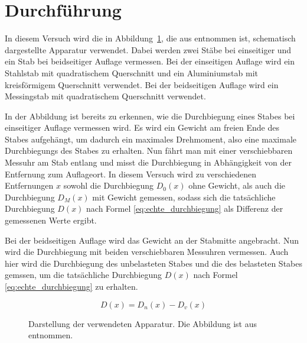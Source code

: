 \section{Durchführung}
In diesem Versuch wird die in Abbildung~\ref{fig:aufbau}, die aus
\textcite{v103} entnommen ist, schematisch dargestellte Apparatur
verwendet.  Dabei werden zwei Stäbe bei einseitiger und ein Stab bei
beidseitiger Auflage vermessen.  Bei der einseitigen Auflage wird ein
Stahlstab mit quadratischem Querschnitt und ein Aluminiumstab mit
kreisförmigem Querschnitt verwendet. Bei der beidseitigen Auflage wird
ein Messingstab mit quadratischem Querschnitt verwendet.

In der Abbildung ist bereits zu erkennen, wie die Durchbiegung eines
Stabes bei einseitiger Auflage vermessen wird. Es wird ein Gewicht am
freien Ende des Stabes aufgehängt, um dadurch ein maximales Drehmoment,
also eine maximale Durchbiegungs des Stabes zu erhalten. Nun fährt man
mit einer verschiebbaren Messuhr am Stab entlang und misst die
Durchbiegung in Abhängigkeit von der Entfernung zum Auflageort. In
diesem Versuch wird zu verschiedenen Entfernungen $x$ sowohl die
Durchbiegung $D_0(x)$ ohne Gewicht, als auch die Durchbiegung $D_M(x)$
mit Gewicht gemessen, sodass sich die tatsächliche Durchbiegung $D(x)$
nach Formel \eqref{eq:echte_durchbiegung} als Differenz der gemessenen
Werte ergibt.

Bei der beidseitigen Auflage wird das Gewicht an der Stabmitte
angebracht. Nun wird die Durchbiegung mit beiden verschiebbaren
Messuhren vermessen. Auch hier wird die Durchbiegung des unbelasteten
Stabes und die des belasteten Stabes gemssen, um die tatsächliche
Durchbiegung $D(x)$ nach Formel \eqref{eq:echte_durchbiegung} zu
erhalten.

\begin{equation}
\label{eq:echte_durchbiegung}
D(x) = D_n(x) - D_v(x)
\end{equation}

\begin{figure}
\centering
\caption{Darstellung der verwendeten Apparatur. Die Abbildung ist aus
  \textcite{v103} entnommen.}
\label{fig:aufbau}
\end{figure} 
